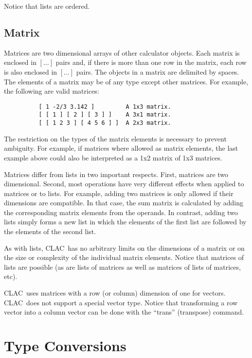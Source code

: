 \documentclass{report}
\newcommand{\CLAC}{CLAC}
\begin{document}
Notice that lists are ordered.

\section{Matrix}

Matrices are two dimensional arrays of other calculator objects. Each
matrix is enclosed in $[\ldots]$ pairs and, if there is more than one
row in the matrix, each row is also enclosed in $[\ldots]$ pairs. The
objects in a matrix are delimited by spaces. The elements of a matrix
may be of any type except other matrices. For example, the following are
valid matrices:

\begin{verbatim}
          [ 1 -2/3 3.142 ]         A 1x3 matrix.
          [ [ 1 ] [ 2 ] [ 3 ] ]    A 3x1 matrix.
          [ [ 1 2 3 ] [ 4 5 6 ] ]  A 2x3 matrix.
\end{verbatim}

The restriction on the types of the matrix elements is necessary to
prevent ambiguity. For example, if matrices where allowed as matrix
elements, the last example above could also be interpreted as a 1x2
matrix of 1x3 matrices.

Matrices differ from lists in two important respects. First, matrices
are two dimensional. Second, most operations have very different effects
when applied to matrices or to lists. For example, adding two matrices
is only allowed if their dimensions are compatible. In that case, the
sum matrix is calculated by adding the corresponding matrix elements
from the operands. In contrast, adding two lists simply forms a new list
in which the elements of the first list are followed by the elements of
the second list.

As with lists, \CLAC\ has no arbitrary limits on the dimensions of a
matrix or on the size or complexity of the individual matrix elements.
Notice that matrices of lists are possible (as are lists of matrices as
well as matrices of lists of matrices, etc).

\CLAC\ uses matrices with a row (or column) dimension of one for
vectors. \CLAC\ does not support a special vector type. Notice that
transforming a row vector into a column vector can be done with the
``trans'' (transpose) command.


\chapter{Type Conversions}
\end{document}
